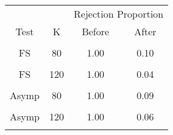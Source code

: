 \begin{table}[!h]
\centering
\begin{tabular}{cccc}
\toprule
\multicolumn{1}{c}{ } & \multicolumn{1}{c}{ } & \multicolumn{2}{c}{Rejection Proportion} \\
\cmidrule(l{3pt}r{3pt}){3-4}
Test & K & Before & After\\
\midrule
\cellcolor{gray!6}{FS} & \cellcolor{gray!6}{60} & \cellcolor{gray!6}{1.00} & \cellcolor{gray!6}{0.09}\\
FS & 80 & 1.00 & 0.10\\
\cellcolor{gray!6}{FS} & \cellcolor{gray!6}{100} & \cellcolor{gray!6}{1.00} & \cellcolor{gray!6}{0.06}\\
FS & 120 & 1.00 & 0.04\\
\cellcolor{gray!6}{Asymp} & \cellcolor{gray!6}{60} & \cellcolor{gray!6}{1.00} & \cellcolor{gray!6}{0.14}\\
\addlinespace
Asymp & 80 & 1.00 & 0.09\\
\cellcolor{gray!6}{Asymp} & \cellcolor{gray!6}{100} & \cellcolor{gray!6}{1.00} & \cellcolor{gray!6}{0.09}\\
Asymp & 120 & 1.00 & 0.06\\
\cellcolor{gray!6}{ECE} & \cellcolor{gray!6}{} & \cellcolor{gray!6}{0.48} & \cellcolor{gray!6}{0.18}\\
\bottomrule
\end{tabular}
\end{table}
